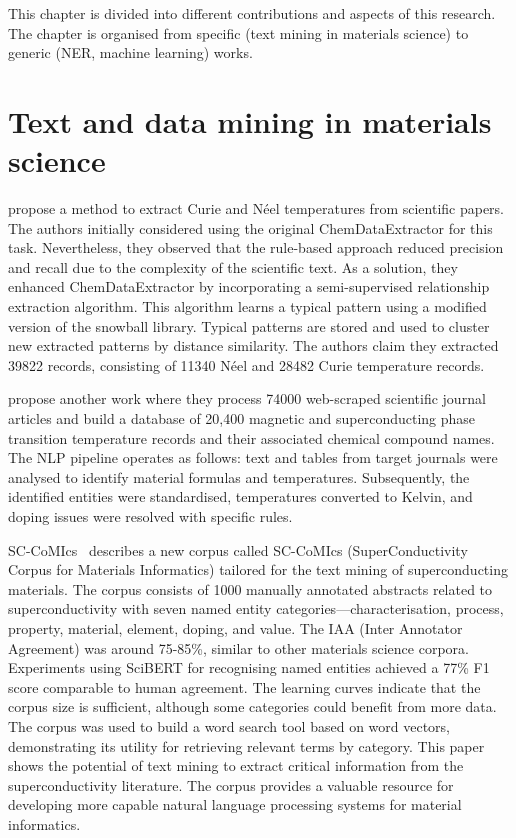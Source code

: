 
This chapter is divided into different contributions and aspects of this research.
The chapter is organised from specific (text mining in materials science) to generic (NER, machine learning) works.

\section{Text and data mining in materials science}

\cite{court2018auto} propose a method to extract Curie and Néel temperatures from scientific papers. 
The authors initially considered using the original ChemDataExtractor for this task. 
Nevertheless, they observed that the rule-based approach reduced precision and recall due to the complexity of the scientific text. As a solution, they enhanced ChemDataExtractor by incorporating a semi-supervised relationship extraction algorithm.
This algorithm learns a typical pattern using a modified version of the snowball library. Typical patterns are stored and used to cluster new extracted patterns by distance similarity. 
The authors claim they extracted 39822 records, consisting of 11340 Néel and 28482 Curie temperature records. 

\cite{court2020magnetic} propose another work where they process 74000 web-scraped scientific journal articles and build a database of 20,400 magnetic and superconducting phase transition temperature records and their associated chemical compound names.
The NLP pipeline operates as follows: text and tables from target journals were analysed to identify material formulas and temperatures. Subsequently, the identified entities were standardised, temperatures converted to Kelvin, and doping issues were resolved with specific rules.



SC-CoMIcs~\cite{yamaguchi-etal-2020-sc} describes a new corpus called SC-CoMIcs (SuperConductivity Corpus for Materials Informatics) tailored for the text mining of superconducting materials.
The corpus consists of 1000 manually annotated abstracts related to superconductivity with seven named entity categories—characterisation, process, property, material, element, doping, and value. The IAA (Inter Annotator Agreement) was around 75-85\%, similar to other materials science corpora.
Experiments using SciBERT for recognising named entities achieved a 77\% F1 score comparable to human agreement.
The learning curves indicate that the corpus size is sufficient, although some categories could benefit from more data. The corpus was used to build a word search tool based on word vectors, demonstrating its utility for retrieving relevant terms by category. This paper shows the potential of text mining to extract critical information from the superconductivity literature. The corpus provides a valuable resource for developing more capable natural language processing systems for material informatics.  

